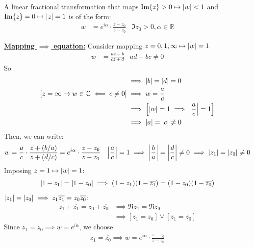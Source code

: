 \documentclass[12pt, english]{book}
\makeatletter
\renewenvironment{proof}[1][\proofname]{\par
	\pushQED{\qed}%
	\normalfont \topsep6\p@\@plus6\p@\relax
	\list{}{%
		\settowidth{\leftmargin}{\itshape\proofname:\hskip\labelsep}%
		\setlength{\labelwidth}{0pt}%
		\setlength{\itemindent}{-\leftmargin}%
	}%
	\item[\hskip\labelsep\itshape#1\@addpunct{:}]\ignorespaces
	}{ \popQED\endlist\@endpefalse}
\makeatother
\begin{document}
	\begin{theorem}
		A linear fractional transformation that maps \(\Im{z}> 0 \mapsto \abs{w}<1\) and \(\Im{z} = 0 \mapsto \abs{z}=1\) is of the form:
		\begin{align*}
			w &= e^{i\alpha} \cdot \frac{z-z_0}{z-\overline{z_0}}
				& \Im{z_0} > 0, \alpha \in \mathbb{R}
		\end{align*}
	\end{theorem}
	\begin{proof}
		\textbf{\underline{Mapping \(\implies\) equation:}} \newline
		Consider mapping \(z = 0, 1, \infty \mapsto \abs{w} = 1\)
		\begin{align*}
			w &= \frac{az + b}{cz + d} & ad - bc \neq 0 
		\end{align*}
		So
		\begin{align*}
			[z = 0 \mapsto \abs{w} = 1 \implies \abs{b/d} = 0] &\implies \abs{b} = \abs{d} = 0 \\
			[z = \infty \mapsto w \in \mathbb{C} \impliedby c \neq 0] &\implies w = \frac{a}{c} \\
			&\implies \left[\abs{w} = 1 \implies \abs{\frac{a}{c}} = 1\right] \\ 
			&\implies \abs{a} = \abs{c} \neq 0
		\end{align*}
		Then, we can write:
		\begin{align*}
			w &= \frac{a}{c} \cdot \frac{z + (b/a)}{z + (d/c)} = e^{i\alpha} \cdot \frac{z-z_0}{z-z_1} &
				\abs{\frac{a}{c}} = 1 \implies \abs{\frac{b}{a}} = \abs{\frac{d}{c}} \neq 0 \implies \abs{z_1} = \abs{z_0} \neq 0
		\end{align*}
		Imposing \(z = 1 \mapsto \abs{w} = 1\):
		\begin{align*}
			\abs{1 - z_1} = \abs{1 - z_0} \implies (1 - z_1)(1 - \overline{z_1}) = (1-z_0)(1-\overline{z_0})
		\end{align*}
		\(\abs{z_1} = \abs{z_0} \implies z_1 \overline{z_1} = z_0 \overline{z_0}\):
		\begin{align*}
			z_1 + \overline{z_1} = z_0 + \overline{z_0} 
			&\implies \Re{z_1} = \Re{z_0} \\ 
			&\implies [z_1 = z_0] \lor [z_1 = \overline{z_0}]
		\end{align*}
		Since \(z_1 = z_0 \implies w = e^{i\alpha}\), we choose
		\begin{align*}
			z_1 = \overline{z_0} \implies w = e^{i\alpha} \cdot \frac{z-z_0}{z-\overline{z_0}}
		\end{align*}
		

\end{proof}
\end{document}
